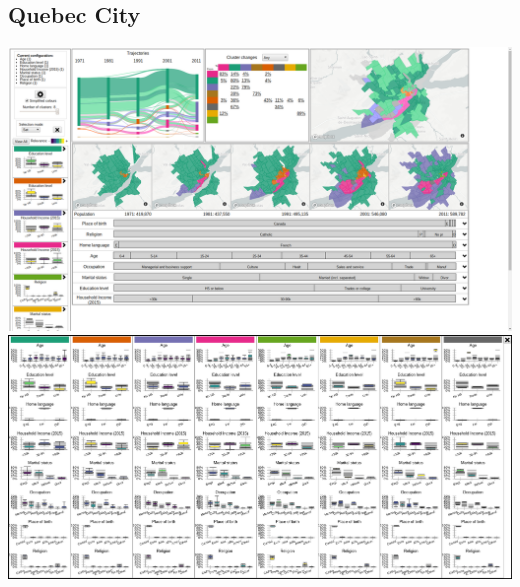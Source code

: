 \documentclass[a4paper]{article}
\begin{document}
\subsection{Quebec City}
\begin{center}
	\includegraphics[width=\linewidth]{5a.png}
	\includegraphics[width=\linewidth]{5b.png}
\end{center}
\end{document}
